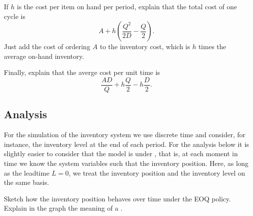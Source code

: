 \begin{exercise}
If $h$ is the cost per item on hand per period,   explain that the total cost of one cycle is 
\begin{equation*}
  A + h\left(\frac{Q^2}{2D} - \frac{Q}2\right).
\end{equation*}
Just add the cost of ordering $A$ to the inventory cost, which is $h$ times the average on-hand inventory. 
\end{exercise}


\begin{exercise}
  Finally, explain that the averge cost per unit time is
\begin{equation*}
 \frac{A D} {Q}  + h\frac{Q}{2} - h\frac{D}2.
\end{equation*}
\end{exercise}

\subsection{Analysis}
\label{sec:analysis}

For the simulation of the inventory system we use discrete time and consider, for instance, the inventory level at the end of each period. For the analysis below it is slightly easier to consider that the model is under , that is, at each moment in time we know the system variables such that the inventory position. Here, as long as the leadtime $L=0$, we treat the inventory position and the inventory level on the same basis. 

\begin{exercise}\label{ex:2}
Sketch how the inventory position behaves over time under the EOQ policy. Explain in the graph the meaning of a .
  \begin{solution}
\begin{center}
\end{center}

  \end{solution}
\end{exercise}


